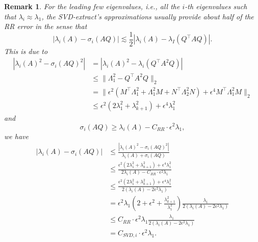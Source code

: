 \documentclass[onefignum,onetabnum]{siamart251216}
\def\svdmethod{SVD-extract}
\newtheorem{remark}{{\sc Remark}}[section]
\begin{document}
\begin{remark}
    \label{remark:Higher-order-of-Nystrom-SVD-vs-RR}
    For the leading few eigenvalues, i.e., all the $i$-th eigenvalues such that $\lambda_i \approx \lambda_1$, the \svdmethod's approximations usually provide about half of the RR error in the sense that
    \[
    |\lambda_i(A) - \sigma_i(AQ)| \lesssim \frac{1}{2} |\lambda_i(A) - \lambda_I(Q^\top A Q)|.
    \]
    This is due to
    \[
    \begin{aligned}
        |\lambda_i(A)^2 - \sigma_i(AQ)^2| & = |\lambda_i(A)^2 - \lambda_i(Q^\top A^2 Q)| \\ 
        & \leq \|\Lambda_1^2 - Q^\top A^2 Q\|_2 \\
        & = \|\epsilon^2 (M^\top \Lambda_1^2 + \Lambda_1^2 M + N^\top \Lambda_2^2 N) + \epsilon^4 M^\top \Lambda_1^2 M\|_2 \\
        & \leq \epsilon^2 (2 \lambda_1^2 + \lambda_{k+1}^2) + \epsilon^4 \lambda_1^2 
    \end{aligned}
    \]
    and
    \[
    \sigma_i(AQ) \geq \lambda_i(A) - C_{RR} \cdot \epsilon^2 \lambda_1,
    \]
    we have
    \begin{equation}
        \label{eq:Upper-bound-SVD}
        \begin{aligned}
            |\lambda_i(A) - \sigma_i(AQ)| & \leq \frac{|\lambda_i(A)^2 - \sigma_i(AQ)^2|}{\lambda_i(A) + \sigma_i(AQ)} \\ 
            & \leq \frac{\epsilon^2 (2 \lambda_1^2 + \lambda_{k+1}^2) + \epsilon^4 \lambda_1^2}{2\lambda_i(A) - C_{RR} \cdot \epsilon^2 \lambda_1}  \\
            & \leq \frac{\epsilon^2 (2 \lambda_1^2 + \lambda_{k+1}^2) + \epsilon^4 \lambda_1^2}{2\left(\lambda_i(A) - 2 \epsilon^2 \lambda_1\right)} \\
            & = \epsilon^2 \lambda_1 \left(2 + \epsilon^2 + \frac{\lambda_{k+1}^2}{\lambda_1^2}\right) \frac{\lambda_1}{2\left(\lambda_i(A) - 2 \epsilon^2 \lambda_1\right)} \\
            & \leq C_{RR} \cdot \epsilon^2 \lambda_1 \frac{\lambda_1}{2\left(\lambda_i(A) - 2 \epsilon^2 \lambda_1\right)} \\
            & = C_{SVD,i} \cdot \epsilon^2 \lambda_1.
        \end{aligned}
    \end{equation}
\end{remark}
\end{document}
